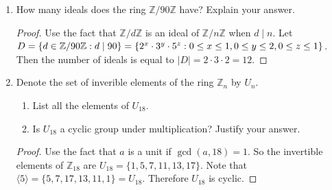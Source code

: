 \documentclass{article}
\theoremstyle{definition}
\begin{document}
\begin{enumerate}
                \begin{enumerate}
                    \item How many units does the ring $\mathbb{Z}/60\mathbb{Z}$ have? Explain your answer.
                    \item How many ideals does the ring $\mathbb{Z}/60\mathbb{Z}$ have? Explain your answer.
                \end{enumerate}
                \begin{proof}
                    For (a), we can use the fact that $a$ is a unit if $\gcd(a,n)=1$. Thus \\ $\mid  U_{60} \mid =\mid \{1,7,11,13,17,19,23,29,31,37,41,43,47,53,57,59\}\mid =16$.

                    For (b) use the fact that $\mathbb{Z}/d\mathbb{Z}$ is an ideal of $\mathbb{Z}/n\mathbb{Z}$ when $d\mid n$. So let $D=\{d\in \mathbb{Z}/60\mathbb{Z}:d\mid 60\}=\\ \{2^x\cdot 3^y\cdot 5^z:0\leq x\leq 2, 0\leq y \leq 1, 0 \leq z \leq 1\}$. Thus the number of ideals is equal to $\mid D\mid =3\cdot 2 \cdot 2=12$
                \end{proof}

            \item How many ideals does the ring $\mathbb{Z}/90\mathbb{Z}$ have? Explain your answer.
                \begin{proof}
                    Use the fact that $\mathbb{Z}/d\mathbb{Z}$ is an ideal of $\mathbb{Z}/n\mathbb{Z}$ when $d\mid n$. Let $D=\{d\in \mathbb{Z}/90\mathbb{Z}:d\mid 90\}= \\ \{2^x \cdot 3^y \cdot 5^z: 0\leq x \leq 1, 0\leq y \leq 2, 0\leq z \leq 1\}$. Then the number of ideals is equal to $\mid D\mid =2\cdot 3 \cdot 2=12$.
                \end{proof}

            \item Denote the set of inverible elements of the ring $\mathbb{Z}_n$ by $U_n$.
                \begin{enumerate}
                    \item List all the elements of $U_{18}$.
                    \item Is $U_{18}$ a cyclic group under multiplication? Justify your answer.
                \end{enumerate}
                
                \begin{proof}
                    Use the fact that $a$ is a unit if $\gcd(a,18)=1$. So the invertible elements of $\mathbb{Z}_{18}$ are $U_{18}=\{1,5,7,11,13,17\}$. Note that $\langle 5 \rangle = \{5,7,17,13,11,1\}=U_{18}$. Therefore $U_{18}$ is cyclic.
                \end{proof}


\end{enumerate}
\end{document}
